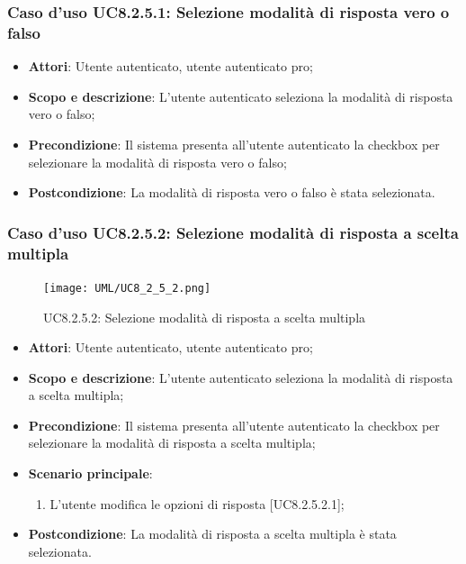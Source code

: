 	\subsubsection{Caso d'uso UC8.2.5.1: Selezione modalità di risposta vero o falso}
	\begin{itemize}
		\item
			\textbf{Attori}: Utente autenticato, utente autenticato pro;
		\item
			\textbf{Scopo e descrizione}: L'utente autenticato seleziona la modalità di risposta vero o falso;
		\item		
			\textbf{Precondizione}: Il sistema presenta all'utente autenticato la checkbox per selezionare la modalità di risposta vero o falso;
		\item
			\textbf{Postcondizione}: La modalità di risposta vero o falso è stata selezionata.
	\end{itemize}
	\subsubsection{Caso d'uso UC8.2.5.2: Selezione modalità di risposta a scelta multipla}
	\label{UC8.2.5.2}
	\begin{figure}[h]
		\centering
			\texttt{[image: UML/UC8\_2\_5\_2.png]}
		\caption{UC8.2.5.2: Selezione modalità di risposta a scelta multipla}
	\end{figure}
	\FloatBarrier	
	\begin{itemize}
		\item
			\textbf{Attori}: Utente autenticato, utente autenticato pro;
		\item
			\textbf{Scopo e descrizione}: L'utente autenticato seleziona la modalità di risposta a scelta multipla;
		\item		
			\textbf{Precondizione}: Il sistema presenta all'utente autenticato la checkbox per selezionare la modalità di risposta a scelta multipla;
		\item
			\textbf{Scenario principale}:
				\begin{enumerate}
					\item 	
						L'utente modifica le opzioni di risposta [UC8.2.5.2.1];	
				\end{enumerate}
		\item
			\textbf{Postcondizione}: La modalità di risposta a scelta multipla è stata selezionata.
	\end{itemize}
